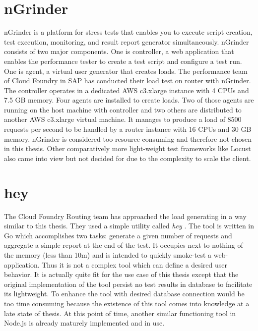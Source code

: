 \section{nGrinder}
nGrinder \citep{NGrinder} is a platform for stress tests that enables you to execute script creation, test execution, monitoring, and result report generator simultaneously. nGrinder consists of two major components. One is  controller, a web application that enables the performance tester to create a test script and configure a test run. One is agent, a virtual user generator that creates loads. 
The performance team of Cloud Foundry in SAP has conducted their load test on router with nGrinder. The controller operates in a dedicated AWS c3.xlarge instance with 4 CPUs and 7.5 GB memory. Four agents are installed to create loads. Two of those agents are running on the host machine with controller and two others are distributed to another AWS c3.xlarge virtual machine. It manages to produce a load of 8500 requests per second to be handled by a router instance with 16 CPUs and 30 GB memory. nGrinder is considered too resource consuming and therefore not chosen in this thesis. Other comparatively more light-weight test frameworks like Locust also came into view but not decided for due to the complexity to scale the client.\\

\section{hey}
The Cloud Foundry Routing team has approached the load generating in a way similar to this thesis. They used a simple utility called \textit{hey} \citep{Hey}. The tool is written in Go which accomplishes two tasks: generate a given number of requests and aggregate a simple report at the end of the test. It occupies next to nothing of the memory (less than 10m) and is intended to quickly smoke-test a web-application. Thus it is not a complex tool which can define a desired user behavior. It is actually quite fit for the use case of this thesis except that the original implementation of the tool persist no test results in database to facilitate its lightweight. To enhance the tool with desired database connection would be too time consuming because the existence of this tool comes into knowledge at a late state of thesis. At this point of time, another similar functioning tool in Node.js is already maturely implemented and in use.\\    

